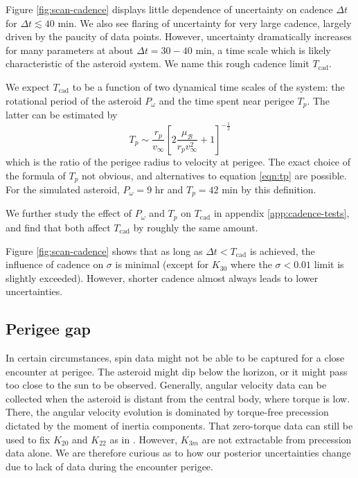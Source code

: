\documentclass[fleqn,usenatbib]{mnras}
\newcommand{\brackets}[1]{\left[ #1 \right]}
\begin{document}
Figure \ref{fig:scan-cadence} displays little dependence of uncertainty on cadence $\Delta t$ for $\Delta t \lesssim 40$ min. We also see flaring of uncertainty for very large cadence, largely driven by the paucity of data points. However, uncertainty dramatically increases for many parameters at about $\Delta t = 30-40$ min, a time scale which is likely characteristic of the asteroid system. We name this rough cadence limit $T_\text{cad}$.

We expect $T_\text{cad}$ to be a function of two dynamical time scales of the system: the rotational period of the asteroid $P_\omega$ and the time spent near perigee $T_p$. The latter can be estimated by
\begin{equation}
  T_p \sim \frac{r_p}{v_\infty}\brackets{2\frac{\mu_\mathcal{B}}{r_pv_\infty^2}+1}^{-\frac{1}{2}}
  \label{eqn:tp}
\end{equation}
which is the ratio of the perigee radius to velocity at perigee. The exact choice of the formula of $T_p$ not obvious, and alternatives to equation \ref{eqn:tp} are possible. For the simulated asteroid, $P_\omega = 9$ hr and $T_p = 42$ min by this definition.

We further study the effect of $P_\omega$ and $T_p$ on $T_\text{cad}$ in appendix \ref{app:cadence-tests}, and find that both affect $T_\text{cad}$ by roughly the same amount.

Figure \ref{fig:scan-cadence} shows that as long as $\Delta t < T_\text{cad}$ is achieved, the influence of cadence on $\sigma$ is minimal (except for $K_{30}$ where the $\sigma<0.01$ limit is slightly exceeded). However, shorter cadence almost always leads to lower uncertainties.



\subsection{Perigee gap}
\label{sec:scan-gap}
In certain circumstances, spin data might not be able to be captured for a close encounter at perigee. The asteroid might dip below the horizon, or it might pass too close to the sun to be observed. Generally, angular velocity data can be collected when the asteroid is distant from the central body, where torque is low. There, the angular velocity evolution is dominated by torque-free precession dictated by the moment of inertia components. That zero-torque data can still be used to fix $K_{20}$ and $K_{22}$ as in \cite{MOSKOVITZ2020113519}. However, $K_{3m}$ are not extractable from precession data alone. We are therefore curious as to how our posterior uncertainties change due to lack of data during the encounter perigee.
\end{document}
